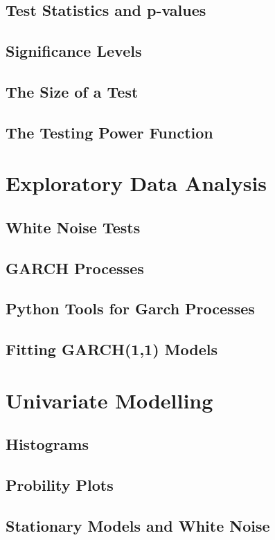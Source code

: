\documentclass[11pt]{article}
\begin{document}
    \section{Test Statistics and p-values}
    \section{Significance Levels}
    \section{The Size of a Test}
    \section{The Testing Power Function}

    \chapter{Exploratory Data Analysis}
    
    \section{White Noise Tests}
    \section{GARCH Processes}
    \section{Python Tools for Garch Processes}
    \section{Fitting GARCH(1,1) Models}
    
    \chapter{Univariate Modelling}
    
    \section{Histograms}
    \section{Probility Plots}
    \section{Stationary Models and White Noise}
\end{document}

